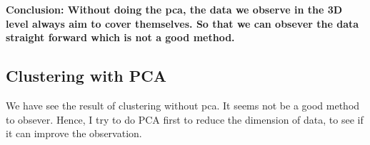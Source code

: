 \documentclass[titlepage,a4paper,12pt,thmsb]{report}
\begin{document}
{\bf Conclusion: Without doing the pca, the data we observe in the 3D level always aim to cover themselves. So that we can obsever the data straight forward which is not a good method.

\newpage


\subsection{Clustering with PCA}

We have see the result of clustering without pca. It seems not be a good method to obsever.  Hence, I try to do PCA first to reduce the dimension of data, to see if it can improve the observation.

\begin{center}
\begin{figure}[h]
{\par}
\end{figure}
{}
\end{center}

\newpage


\begin{center}
\begin{figure}[h]
{\par}
\end{figure}
{}
\end{center}


}
\end{document}
